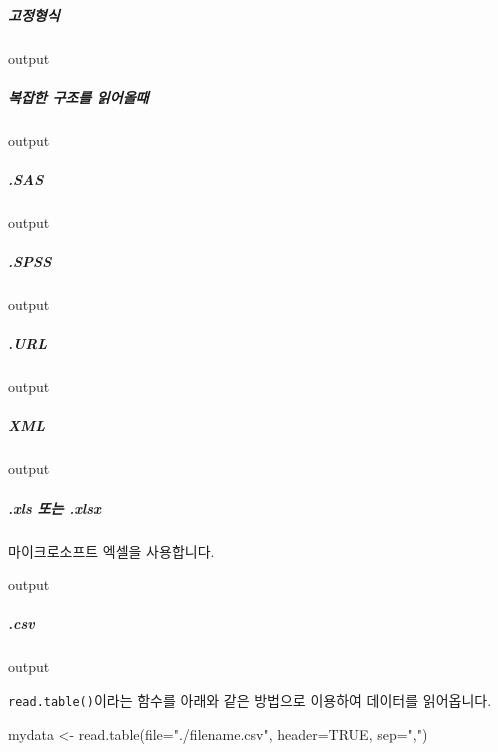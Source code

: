 \documentclass{book}
\begin{document}
\subparagraph{고정형식}
\begin{Schunk}
\begin{Soutput}
output
\end{Soutput}
\end{Schunk}

\subparagraph{복잡한 구조를 읽어올때}
\begin{Schunk}
\begin{Soutput}
output
\end{Soutput}
\end{Schunk}

\subparagraph{.SAS}
\begin{Schunk}
\begin{Soutput}
output
\end{Soutput}
\end{Schunk}

\subparagraph{.SPSS}
\begin{Schunk}
\begin{Soutput}
output
\end{Soutput}
\end{Schunk}

\subparagraph{.URL}
\begin{Schunk}
\begin{Soutput}
output
\end{Soutput}
\end{Schunk}

\subparagraph{XML}
\begin{Schunk}
\begin{Soutput}
output
\end{Soutput}
\end{Schunk}

\subparagraph{.xls 또는 .xlsx}
마이크로소프트 엑셀을 사용합니다. 
\begin{Schunk}
\begin{Soutput}
output
\end{Soutput}
\end{Schunk}

\subparagraph{.csv}
\begin{Schunk}
\begin{Soutput}
output
\end{Soutput}
\end{Schunk}

\texttt{read.table()}이라는 함수를 아래와 같은 방법으로 이용하여 데이터를 읽어옵니다.

\begin{Schunk}
\begin{Soutput}
mydata <- read.table(file="./filename.csv", header=TRUE, sep=",")
\end{Soutput}
\end{Schunk}
\end{document}
